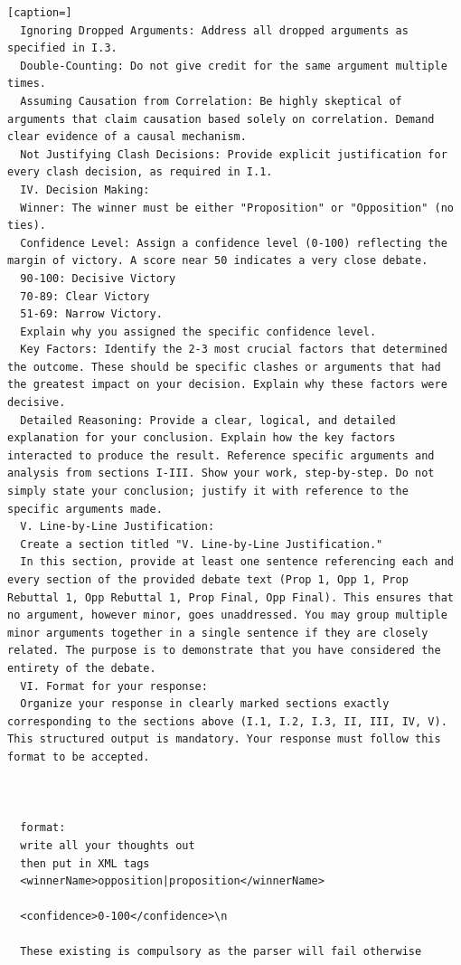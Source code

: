 \documentclass{article}
\begin{document}
\begin{lstlisting}[caption=]
  Ignoring Dropped Arguments: Address all dropped arguments as specified in I.3.
  Double-Counting: Do not give credit for the same argument multiple times.
  Assuming Causation from Correlation: Be highly skeptical of arguments that claim causation based solely on correlation. Demand clear evidence of a causal mechanism.
  Not Justifying Clash Decisions: Provide explicit justification for every clash decision, as required in I.1.
  IV. Decision Making:
  Winner: The winner must be either "Proposition" or "Opposition" (no ties).
  Confidence Level: Assign a confidence level (0-100) reflecting the margin of victory. A score near 50 indicates a very close debate.
  90-100: Decisive Victory
  70-89: Clear Victory
  51-69: Narrow Victory.
  Explain why you assigned the specific confidence level.
  Key Factors: Identify the 2-3 most crucial factors that determined the outcome. These should be specific clashes or arguments that had the greatest impact on your decision. Explain why these factors were decisive.
  Detailed Reasoning: Provide a clear, logical, and detailed explanation for your conclusion. Explain how the key factors interacted to produce the result. Reference specific arguments and analysis from sections I-III. Show your work, step-by-step. Do not simply state your conclusion; justify it with reference to the specific arguments made.
  V. Line-by-Line Justification:
  Create a section titled "V. Line-by-Line Justification."
  In this section, provide at least one sentence referencing each and every section of the provided debate text (Prop 1, Opp 1, Prop Rebuttal 1, Opp Rebuttal 1, Prop Final, Opp Final). This ensures that no argument, however minor, goes unaddressed. You may group multiple minor arguments together in a single sentence if they are closely related. The purpose is to demonstrate that you have considered the entirety of the debate.
  VI. Format for your response:
  Organize your response in clearly marked sections exactly corresponding to the sections above (I.1, I.2, I.3, II, III, IV, V). This structured output is mandatory. Your response must follow this format to be accepted.



  format:
  write all your thoughts out
  then put in XML tags
  <winnerName>opposition|proposition</winnerName>

  <confidence>0-100</confidence>\n

  These existing is compulsory as the parser will fail otherwise
\end{lstlisting}
\end{document}
